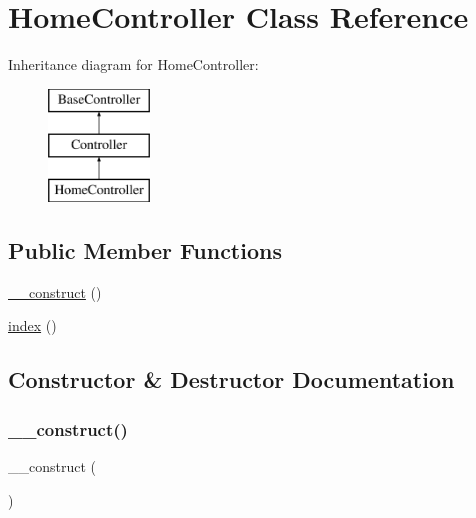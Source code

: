 \hypertarget{class_app_1_1_http_1_1_controllers_1_1_home_controller}{}\section{Home\+Controller Class Reference}
\label{class_app_1_1_http_1_1_controllers_1_1_home_controller}
Inheritance diagram for Home\+Controller\+:\begin{figure}[H]
\begin{center}
\leavevmode
\includegraphics[height=3.000000cm]{class_app_1_1_http_1_1_controllers_1_1_home_controller}
\end{center}
\end{figure}
\subsection*{Public Member Functions}
\begin{DoxyCompactItemize}
\item 
\mbox{\hyperlink{class_app_1_1_http_1_1_controllers_1_1_home_controller_a095c5d389db211932136b53f25f39685}{\+\_\+\+\_\+construct}} ()
\item 
\mbox{\hyperlink{class_app_1_1_http_1_1_controllers_1_1_home_controller_a149eb92716c1084a935e04a8d95f7347}{index}} ()
\end{DoxyCompactItemize}


\subsection{Constructor \& Destructor Documentation}
\mbox{\label{class_app_1_1_http_1_1_controllers_1_1_home_controller_a095c5d389db211932136b53f25f39685}} 
\subsubsection{\texorpdfstring{\_\_construct()}{\_\_construct()}}
{\footnotesize\ttfamily \+\_\+\+\_\+construct (\begin{DoxyParamCaption}{ }\end{DoxyParamCaption})}

